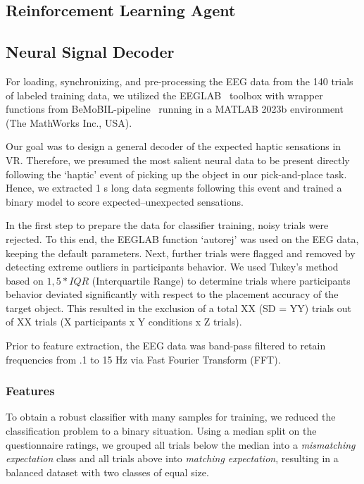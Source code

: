 \subsection{Reinforcement Learning Agent}\label{RL}




\subsection{Neural Signal Decoder}
For loading, synchronizing, and pre-processing the EEG data from the 140 trials of labeled training data, we utilized the EEGLAB~\cite{Delorme2004-sn} toolbox with wrapper functions from BeMoBIL-pipeline~\cite{Klug2022-lc} running in a MATLAB 2023b environment (The MathWorks Inc., USA).

Our goal was to design a general decoder of the expected haptic sensations in VR. Therefore, we presumed the most salient neural data to be present directly following the `haptic' event of picking up the object in our pick-and-place task. Hence, we extracted 1 s long data segments following this event and trained a binary model to score expected--unexpected sensations.

In the first step to prepare the data for classifier training, noisy trials were rejected. To this end, the EEGLAB function `autorej' was used on the EEG data, keeping the default parameters. Next, further trials were flagged and removed by detecting extreme outliers in participants behavior. We used Tukey's method~\cite{Tukey1949-sl} based on $1,5*IQR$ (Interquartile Range) to determine trials where participants behavior deviated significantly with respect to the placement accuracy of the target object. This resulted in the exclusion of a total XX (SD = YY) trials out of XX trials (X participants x Y conditions x Z trials).

Prior to feature extraction, the EEG data was band-pass filtered to retain frequencies from .1 to 15 Hz via Fast Fourier Transform (FFT).

\subsubsection{Features}
To obtain a robust classifier with many samples for training, we reduced the classification problem to a binary situation. Using a median split on the questionnaire ratings, we grouped all trials below the median into a \textit{mismatching expectation} class and all trials above into \textit{matching expectation}, resulting in a balanced dataset with two classes of equal size. 

